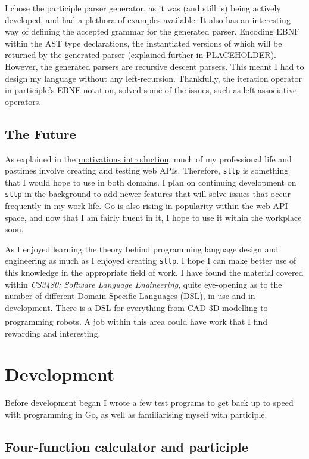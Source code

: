 \documentclass[]{full}
\theoremstyle{definition}
\begin{document}
I chose the participle parser generator, as it was (and still is) being actively developed, and had a plethora of examples available. It also has an interesting way of defining the accepted grammar for the generated parser. Encoding EBNF within the AST type declarations, the instantiated versions of which will be returned by the generated parser (explained further in PLACEHOLDER). However, the generated parsers are recursive descent parsers. This meant I had to design my language without any left-recursion. Thankfully, the iteration operator in participle's EBNF notation, solved some of the issues, such as left-associative operators.

\section{The Future}

As explained in the \hyperref[chap:motivations]{motivations introduction}, much of my professional life and pastimes involve creating and testing web APIs. Therefore, \verb|sttp| is something that I would hope to use in both domains. I plan on continuing development on \verb|sttp| in the background to add newer features that will solve issues that occur frequently in my work life. Go is also rising in popularity within the web API space, and now that I am fairly fluent in it, I hope to use it within the workplace soon.

As I enjoyed learning the theory behind programming language design and engineering as much as I enjoyed creating \verb|sttp|. I hope I can make better use of this knowledge in the appropriate field of work. I have found the material covered within \textit{CS3480: Software Language Engineering}, quite eye-opening as to the number of different Domain Specific Languages (DSL), in use and in development. There is a DSL for everything from CAD 3D modelling to programming robots\textsuperscript{\cite{nordmann_hochgeschwender_wrede_2014}}. A job within this area could have work that I find rewarding and interesting.

\chapter{Development}
\label{chap:development}

Before development began I wrote a few test programs to get back up to speed with programming in Go, as well as familiarising myself with participle.

\section{Four-function calculator and participle}
\label{sec:four-function-calc}
\end{document}
